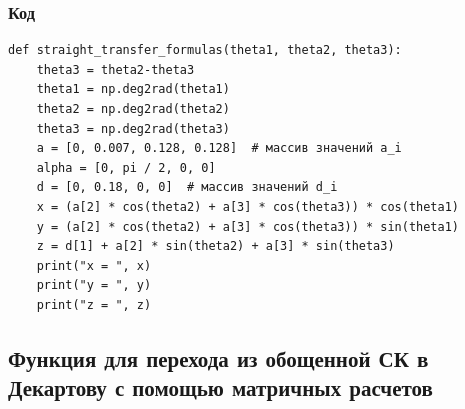 \documentclass{article}
\begin{document}
\subsubsection*{Код}
\begin{verbatim}
def straight_transfer_formulas(theta1, theta2, theta3):
    theta3 = theta2-theta3
    theta1 = np.deg2rad(theta1)
    theta2 = np.deg2rad(theta2)
    theta3 = np.deg2rad(theta3)
    a = [0, 0.007, 0.128, 0.128]  # массив значений a_i
    alpha = [0, pi / 2, 0, 0]
    d = [0, 0.18, 0, 0]  # массив значений d_i
    x = (a[2] * cos(theta2) + a[3] * cos(theta3)) * cos(theta1)
    y = (a[2] * cos(theta2) + a[3] * cos(theta3)) * sin(theta1)
    z = d[1] + a[2] * sin(theta2) + a[3] * sin(theta3)
    print("x = ", x)
    print("y = ", y)
    print("z = ", z)

\end{verbatim}


\subsection{Функция для перехода из обощенной СК в Декартову с помощью матричных расчетов}
\end{document}
